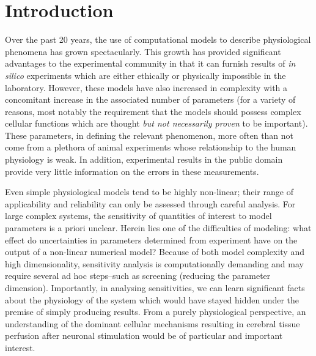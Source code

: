 \documentclass[smallextended]{svjour3}
\numberwithin{equation}{section}
\begin{document}
\section{Introduction}\label{sec:intro}
Over the past 20 years, the use of computational models to describe physiological phenomena has grown spectacularly. This growth has provided significant advantages to the experimental community in that it can furnish results of \textit{in silico} experiments which are either ethically or physically impossible in the laboratory. However, these models have also increased in complexity with a concomitant increase in the associated number of parameters (for a variety of reasons, most notably the requirement that the models should possess complex cellular functions which are thought \textit{but not necessarily proven} to be important). These parameters, in defining the relevant phenomenon, more often than not come from a plethora of animal experiments whose relationship to the human physiology is weak.  In addition, experimental results in the public domain provide very little information on the errors in these measurements. 

Even simple physiological models tend to be  highly non-linear; their range of applicability and reliability can only be assessed  through careful analysis. For large complex systems, the sensitivity of quantities of interest to model parameters is a priori unclear. Herein lies one of the difficulties of modeling: what effect do uncertainties in parameters determined from experiment have on the output of a non-linear numerical model? Because of both model complexity and high dimensionality, sensitivity analysis is  computationally demanding and may require several ad hoc steps--such as screening (reducing the parameter dimension). Importantly, in analysing  sensitivities, we can learn significant facts about the physiology of the system which would have stayed hidden under the premise of simply producing results. 
From a purely physiological perspective, an understanding of the dominant cellular mechanisms resulting in cerebral tissue perfusion after neuronal stimulation would be of particular and important interest. 
\end{document}
